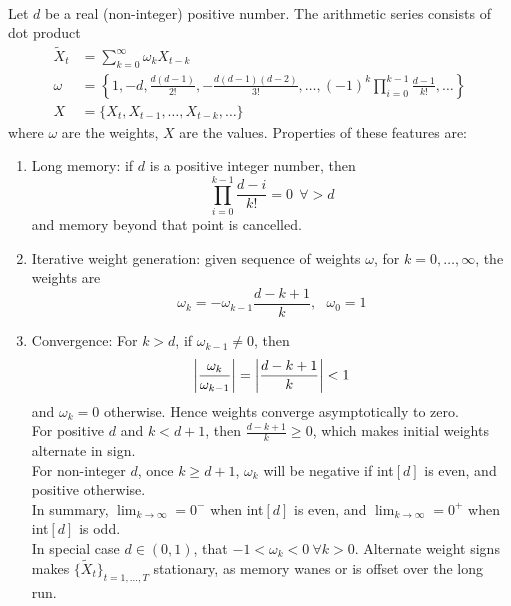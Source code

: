 \documentclass[a4paper,oneside,openany]{book}
\begin{document}
\begin{remark}
\label{rmk:propfracdifffeat} 
\\
Let $d$ be a real (non-integer) positive number. The arithmetic series consists of dot product
\begin{align}
\tilde{X}_t &= \sum\limits_{k=0}^{\infty} \omega_k X_{t-k} \nonumber \\
\omega &= \left\{ 1, -d, \frac{d(d-1)}{2!}, - \frac{d(d-1)(d-2)}{3!}, \ldots, (-1)^k \prod\limits_{i=0}^{k-1} \frac{d-1}{k!}, \ldots \right\} \nonumber \\
X &= \{X_t, X_{t-1}, \ldots, X_{t-k}, \ldots \} \nonumber
\end{align}
where $\omega$ are the weights, $X$ are the values. Properties of these features are:
\begin{enumerate}[label=\roman*.]
\setlength{\itemsep}{0pt}
\item Long memory: if $d$ is a positive integer number, then
\begin{equation*}
\prod\limits_{i=0}^{k-1} \frac{d-i}{k!} = 0 \ \ \forall > d \nonumber
\end{equation*}
and memory beyond that point is cancelled.
\item Iterative weight generation: given sequence of weights $\omega$, for $k = 0, \ldots, \infty$, the weights are
\begin{equation*}
\omega_k = - \omega_{k-1} \frac{d - k + 1}{k}, \ \ \ \omega_0 = 1 \nonumber
\end{equation*}
\item Convergence: For $k > d$, if $\omega_{k-1} \neq 0$, then
\begin{equation*}
\left\lvert\frac{\omega_{k}}{\omega_{k-1}}\right\rvert = \left\lvert\frac{d-k+1}{k}\right\rvert < 1 \nonumber
\end{equation*}
and $\omega_k = 0$ otherwise. Hence weights converge asymptotically to zero.\\
For positive $d$ and $k < d+1$, then $\frac{d-k+1}{k} \geq 0$, which makes initial weights alternate in sign.\\
For non-integer $d$, once $k \geq d+1$, $\omega_k$ will be negative if int$[d]$ is even, and positive otherwise.\\
In summary, $\lim_{k \rightarrow \infty} = 0^-$ when int$[d]$ is even, and $\lim_{k \rightarrow \infty} = 0^+$ when int$[d]$ is odd.\\
In special case $d \in (0,1)$, that $-1 < \omega_k < 0 \ \forall k > 0$. Alternate weight signs makes $\{\tilde{X}_t \}_{t = 1, \ldots, T}$ stationary, as memory wanes or is offset over the long run.
\end{enumerate}
\end{remark}
\end{document}
